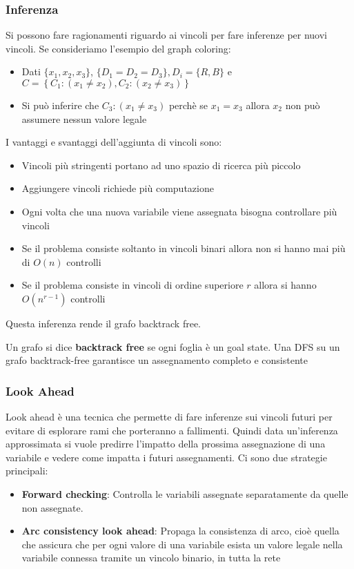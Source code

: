 \documentclass[a4paper]{article}
\begin{document}
\subsubsection{Inferenza}
Si possono fare ragionamenti riguardo ai vincoli per fare inferenze per nuovi vincoli.
Se consideriamo l'esempio del graph coloring:
\begin{itemize}
  \item Dati \( \{x_1, x_2, x_3\} \), \( \{D_1 = D_2 = D_3\}, D_i = \{R, B\}  \) e\\
    \( C = \left\{ C_1: (x_1 \neq x_2), C_2: (x_2 \neq x_3) \right\} \)
  \item Si può inferire che \( C_3: (x_1 \neq x_3) \) perchè se \( x_1 = x_3 \)
    allora \( x_2 \) non può assumere nessun valore legale
\end{itemize}
\noindent
I vantaggi e svantaggi dell'aggiunta di vincoli sono:
\begin{itemize}
  \item Vincoli più stringenti portano ad uno spazio di ricerca più piccolo
  \item Aggiungere vincoli richiede più computazione
  \item Ogni volta che una nuova variabile viene assegnata bisogna controllare più
    vincoli
  \item Se il problema consiste soltanto in vincoli binari allora non si hanno mai più
    di \( O(n) \) controlli
  \item Se il problema consiste in vincoli di ordine superiore \( r \) allora si hanno
    \( O(n^{r-1}) \) controlli
\end{itemize}
Questa inferenza rende il grafo backtrack free.

\vspace{1em}
\noindent
Un grafo si dice \textbf{backtrack free} se ogni foglia è un goal state. Una DFS su un
grafo backtrack-free garantisce un assegnamento completo e consistente

\subsubsection{Look Ahead}
Look ahead è una tecnica che permette di fare inferenze sui vincoli futuri
per evitare di esplorare rami che porteranno a fallimenti. Quindi data un'inferenza
approssimata si vuole predirre l'impatto della prossima assegnazione di una variabile
e vedere come impatta i futuri assegnamenti. Ci sono due strategie principali:
\begin{itemize}
  \item \textbf{Forward checking}: Controlla le variabili assegnate separatamente
    da quelle non assegnate.
  \item \textbf{Arc consistency look ahead}: Propaga la consistenza di arco, cioè quella
    che assicura che per ogni valore di una variabile esista un valore legale
    nella variabile connessa tramite un vincolo binario, in tutta la rete
\end{itemize}
\end{document}
